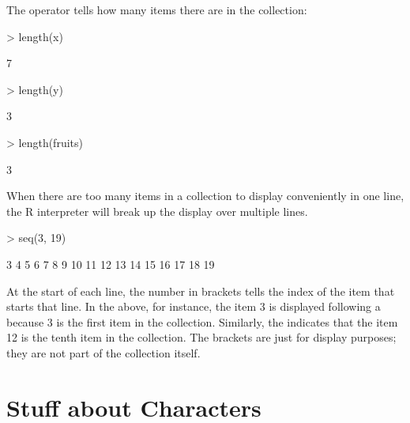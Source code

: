 The  operator tells how many items there are in the
collection: 
\begin{Schunk}
\begin{Sinput}
> length(x)
\end{Sinput}
\begin{Soutput}
[1] 7
\end{Soutput}
\begin{Sinput}
> length(y)
\end{Sinput}
\begin{Soutput}
[1] 3
\end{Soutput}
\begin{Sinput}
> length(fruits)
\end{Sinput}
\begin{Soutput}
[1] 3
\end{Soutput}
\end{Schunk}

When there are too many items in a collection to display conveniently
in one line, the R interpreter will break up the display over multiple
lines.  
\begin{Schunk}
\begin{Sinput}
> seq(3, 19)
\end{Sinput}
\begin{Soutput}
 [1]  3  4  5  6  7  8  9 10 11 12 13 14 15 16 17 18 19
\end{Soutput}
\end{Schunk}
At the start of each line, the number in brackets tells the
index of the item that starts that line.  In the above, for instance,
the item 3 is displayed following a \code{[1]} because 3 is the first
item in the collection.  Similarly, the \code{[10]} indicates that the
item 12 is the tenth item in the collection.  The brackets are just
for display purposes; they are not part of the collection itself.

\section{Stuff about Characters}

